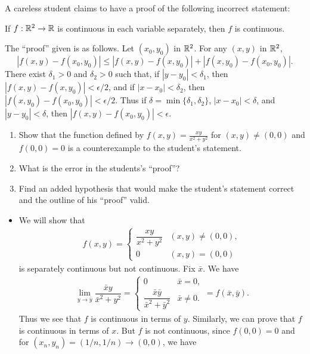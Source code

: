 \begin{problem}
A careless student claims to have a proof of the following incorrect statement:
\begin{center}
    If $f: \mathbb{R}^2 \to \mathbb{R}$ is continuous in each variable separately, then $f$ is continuous.
\end{center}
The ``proof'' given is as follows. Let $(x_0, y_0)$ in $\mathbb{R}^2$. For any $(x,y)$ in $\mathbb{R}^2$,
$$ |f(x,y) - f(x_0, y_0)| \leq |f(x,y) - f(x,y_0)| + |f(x,y_0) - f(x_0, y_0)|. $$
There exist $\delta_1 > 0$ and $\delta_2 > 0$ such that, if $|y - y_0| < \delta_1$, then $|f(x,y) - f(x,y_0)| < \epsilon/2$, and if $|x - x_0| < \delta_2$, then $|f(x,y_0) - f(x_0,y_0)| < \epsilon/2$. Thus if $\delta = \min\{\delta_1, \delta_2\}$, $|x - x_0| < \delta$, and $|y - y_0| < \delta$, then $|f(x,y) - f(x_0, y_0)| < \epsilon$.
\begin{enumerate}
    \item[(a)] Show that the function defined by $f(x,y) = \frac{xy}{x^2 + y^2}$ for $(x,y) \neq (0,0)$ and $f(0,0) = 0$ is a counterexample to the student's statement.
    \item[(b)] What is the error in the students's ``proof''?
    \item[(c)] Find an added hypothesis that would make the student's statement correct and the outline of his ``proof'' valid.
\end{enumerate}
\begin{solution}
\begin{itemize}
    \item[(a)] We will show that 
    \begin{align*}
        f(x,y) = \begin{cases}
        \dfrac{xy}{x^2 + y^2} & (x,y) \ne (0,0),\\
        0 & (x,y) = (0,0)
        \end{cases}
    \end{align*}
    is separately continuous but not continuous. Fix $\bar x$. We have 
    \begin{align*}
        \lim_{y \to \bar y} \dfrac{\bar xy}{\bar x^2 + y^2} = \begin{cases}
        0 & \bar x = 0, \\
        \dfrac{\bar x\bar y}{\bar x^2 + \bar y^2} & \bar x \ne 0.
        \end{cases} = f(\bar x,\bar y).
    \end{align*}
    Thus we see that $f$ is continuous in terms of $y$. Similarly, we can prove that $f$ is continuous in terms of $x$. But $f$ is not continuous, since $f(0,0) = 0$ and for $(x_n,y_n)=(1/n,1/n) \to (0,0)$, we have 

\end{itemize}
\end{solution}
\end{problem}

